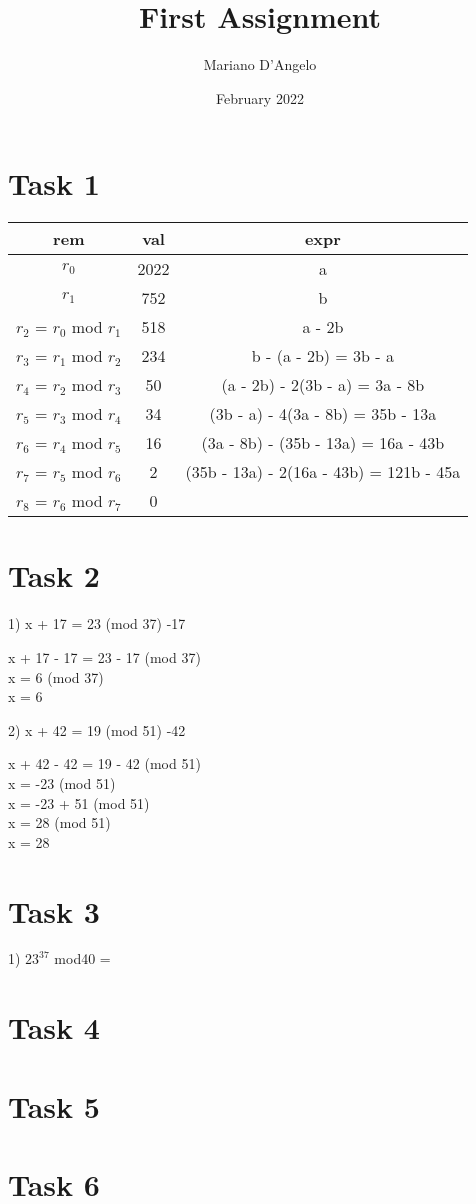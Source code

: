 \documentclass[12pt]{article}
\title{First Assignment}
\author{Mariano D'Angelo}
\date{February 2022}
\begin{document}
\maketitle

\section*{Task 1}
\begin{tabular}{ | c | c | c | } \hline
    \textbf{rem} & \textbf{val} & \textbf{expr} \\ \hline
    $r_0$ & 2022 & a \\
    $r_1$ & 752 & b \\
    $r_2$ = $r_0$ mod $r_1$ & 518 & a - 2b \\
    $r_3$ = $r_1$ mod $r_2$ & 234 & b - (a - 2b) = 3b - a \\
    $r_4$ = $r_2$ mod $r_3$ & 50 & (a - 2b) - 2(3b - a) = 3a - 8b \\
    $r_5$ = $r_3$ mod $r_4$ & 34 & (3b - a) - 4(3a - 8b) = 35b - 13a \\
    $r_6$ = $r_4$ mod $r_5$ & 16 & (3a - 8b) - (35b - 13a) = 16a - 43b \\
    $r_7$ = $r_5$ mod $r_6$ & 2 & (35b - 13a) - 2(16a - 43b) = 121b - 45a \\ \hline
    $r_8$ = $r_6$ mod $r_7$ & 0 & \\ \hline
\end{tabular}


\section*{Task 2} 
1) x + 17 = 23 (mod 37) \textbar{} -17
\begin{addmargin}[1.22em]{0em}
x + 17 - 17 = 23 - 17 (mod 37) \\
x = 6 (mod 37) \\
x = 6 \\
\end{addmargin}
2) x + 42 = 19 (mod 51) \textbar{} -42
\begin{addmargin}[1.22em]{0em}
x + 42 - 42 = 19 - 42 (mod 51) \\
x = -23 (mod 51) \\
x = -23 + 51 (mod 51) \\   
x = 28 (mod 51) \\
x = 28 
\end{addmargin}


\section*{Task 3} 
1) $23^{37}$ mod40 = \\
\begin{addmargin}[1.22em]{0em}

\end{addmargin}


\section*{Task 4}


\section*{Task 5}


\section*{Task 6}
\end{document}
